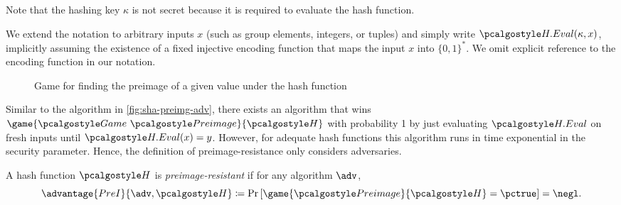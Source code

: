 Note that the hashing key $\kappa$ is not secret because it is required to evaluate the hash function.

\begin{remark}
  We extend the notation to arbitrary inputs $x$ (such as group elements, integers, or tuples) and simply write $\algo{H.Eval}(\kappa, x)$, implicitly assuming the existence of a fixed injective encoding function that maps the input $x$ into $\{0,1\}^*$.
  We omit explicit reference to the encoding function in our notation.
\end{remark}

\begin{figure}[tbhp]
  \begin{center}
    \begin{tcolorbox}[width=5cm]
      \begin{pchstack}[center]
      \end{pchstack}
    \end{tcolorbox}
  \end{center}
  \caption{Game for finding the preimage of a given value under the hash function \label{fig:break-hash}}
\end{figure}

Similar to the algorithm in \autoref{fig:sha-preimg-adv}, there exists an algorithm that wins $\game{\Game~\algo{Preimage}}{\algo{H}}$ with probability 1 by just evaluating $\algo{H.Eval}$ on fresh inputs until $\algo{H.Eval}(x) = y$.
However, for adequate hash functions this algorithm runs in time exponential in the security parameter.
Hence, the definition of preimage-resistance only considers \ppt adversaries.

\begin{definition}\label{def:preimage-resistance}
  A hash function $\algo{H}$ is \emph{preimage-resistant} if for any \ppt algorithm $\adv$,
 \[
  \advantage{PreI}{\adv, \algo{H}} \defeq \pr{\game{\algo{Preimage}}{\algo{H}} = \pctrue} = \negl.
 \]
\end{definition}


